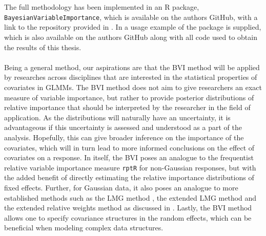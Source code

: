 \\
\\
The full methodology has been implemented in an R package, \texttt{BayesianVariableImportance}, which is available on the authors GitHub, with a link to the repository provided in . In  a usage example of the package is supplied, which is also available on the authors GitHub along with all code used to obtain the results of this thesis.
\\
\\
Being a general method, our aspirations are that the BVI method will be applied by researches across disciplines that are interested in the statistical properties of covariates in GLMMs. The BVI method does not aim to give researchers an exact measure of variable importance, but rather to provide posterior distributions of relative importance that should be interpreted by the researcher in the field of application. As the distributions will naturally have an uncertainty, it is advantageous if this uncertainty is assessed and understood as a part of the analysis. Hopefully, this can give broader inference on the importance of the covariates, which will in turn lead to more informed conclusions on the effect of covariates on a response. In itself, the BVI poses an analogue to the frequentist relative variable importance measure \texttt{rptR} for non-Gaussian responses, but with the added benefit of directly estimating the relative importance distributions of fixed effects. Further, for Gaussian data, it also poses an analogue to more established methods such as the LMG method \citep{gromping_relaimpo}, the extended LMG method \citep{matre} and the extended relative weights method \citep{matre} as discussed in \citet{Arnstad:Relative_variable_importance_in_Bayesian_linear_mixed_models:2024}. Lastly, the BVI method allows one to specify covariance structures in the random effects, which can be beneficial when modeling complex data structures.
\\
\\
